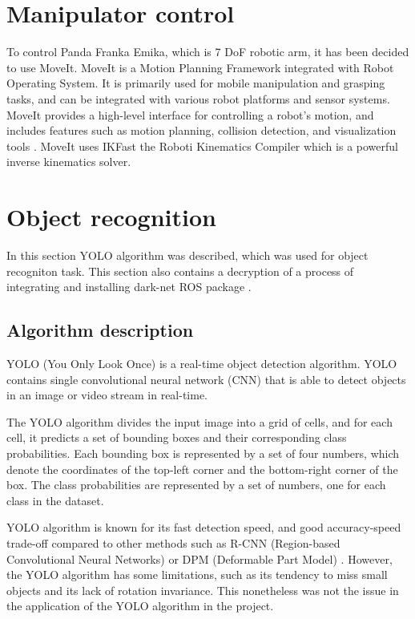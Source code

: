 \documentclass[conference,a4paper]{IEEEtran}
\begin{document}
\section{Manipulator control}
To control Panda Franka Emika, which is 7 DoF robotic arm, it has been decided to use MoveIt. MoveIt is a Motion Planning Framework integrated with Robot Operating System. It is primarily used for mobile manipulation and grasping tasks, and can be integrated with various robot platforms and sensor systems. MoveIt provides a high-level interface for controlling a robot's motion, and includes features such as motion planning, collision detection, and visualization tools \cite{MOVEIT}.
MoveIt uses IKFast the Roboti Kinematics Compiler which is a powerful inverse kinematics solver. 

\section{Object recognition}
In this section YOLO algorithm was described, which was used for object recogniton task. This section also contains a decryption of a process of integrating and installing dark-net ROS package \cite{YOLO_ROS}.

\subsection{Algorithm description}
YOLO (You Only Look Once) is a real-time object detection algorithm. YOLO contains single convolutional neural network (CNN) that is able to detect objects in an image or video stream in real-time. 

The YOLO algorithm divides the input image into a grid of cells, and for each cell, it predicts a set of bounding boxes and their corresponding class probabilities. Each bounding box is represented by a set of four numbers, which denote the coordinates of the top-left corner and the bottom-right corner of the box. The class probabilities are represented by a set of numbers, one for each class in the dataset.

YOLO algorithm is known for its fast detection speed, and good accuracy-speed trade-off compared to other methods such as R-CNN (Region-based Convolutional Neural Networks) or DPM (Deformable Part Model) \cite{YOLO_paper}. However, the YOLO algorithm has some limitations, such as its tendency to miss small objects and its lack of rotation invariance. This nonetheless was not the issue in the application of the YOLO algorithm in the project. 
\end{document}
